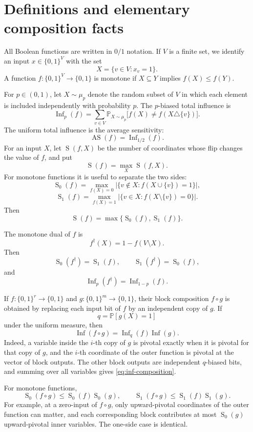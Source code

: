 \documentclass[11pt]{article}
\newcommand{\Prb}{\mathbb P}
\newcommand{\Inf}{\operatorname{Inf}}
\newcommand{\AS}{\operatorname{AS}}
\newcommand{\sens}{\operatorname{S}}
\begin{document}
\section{Definitions and elementary composition facts}\label{sec:defs}

All Boolean functions are written in \(0/1\) notation. If \(V\) is a finite set, we identify an input \(x\in\{0,1\}^V\) with the set
\[
    X=\{v\in V:x_v=1\}.
\]
A function \(f:\{0,1\}^V\to\{0,1\}\) is monotone if \(X\subseteq Y\) implies \(f(X)\le f(Y)\).

For \(p\in(0,1)\), let \(X\sim\mu_p\) denote the random subset of \(V\) in which each element is included independently with probability \(p\). The \(p\)-biased total influence is
\[
    \Inf_p(f)
    =
    \sum_{v\in V}
    \Prb_{X\sim\mu_p}\bigl[f(X)\ne f(X\triangle\{v\})\bigr].
\]
The uniform total influence is the average sensitivity:
\[
    \AS(f)=\Inf_{1/2}(f).
\]
For an input \(X\), let \(\sens(f,X)\) be the number of coordinates whose flip changes the value of \(f\), and put
\[
    \sens(f)=\max_X \sens(f,X).
\]
For monotone functions it is useful to separate the two sides:
\[
    \sens_0(f)=
    \max_{f(X)=0}
    \bigl|\{v\notin X:f(X\cup\{v\})=1\}\bigr|,
\]
\[
    \sens_1(f)=
    \max_{f(X)=1}
    \bigl|\{v\in X:f(X\setminus\{v\})=0\}\bigr|.
\]
Then
\[
    \sens(f)=\max\{\sens_0(f),\sens_1(f)\}.
\]

The monotone dual of \(f\) is
\[
    f^\dagger(X)=1-f(V\setminus X).
\]
Then
\[
    \sens_0(f^\dagger)=\sens_1(f),
    \qquad
    \sens_1(f^\dagger)=\sens_0(f),
\]
and
\[
    \Inf_p(f^\dagger)=\Inf_{1-p}(f).
\]

If \(f:\{0,1\}^r\to\{0,1\}\) and \(g:\{0,1\}^m\to\{0,1\}\), their block composition \(f\circ g\) is obtained by replacing each input bit of \(f\) by an independent copy of \(g\). If
\[
    q=\Prb[g(X)=1]
\]
under the uniform measure, then
\begin{equation}\label{eq:inf-composition}
    \Inf(f\circ g)=\Inf_q(f)\Inf(g).
\end{equation}
Indeed, a variable inside the \(i\)-th copy of \(g\) is pivotal exactly when it is pivotal for that copy of \(g\), and the \(i\)-th coordinate of the outer function is pivotal at the vector of block outputs. The other block outputs are independent \(q\)-biased bits, and summing over all variables gives \eqref{eq:inf-composition}.

For monotone functions,
\begin{equation}\label{eq:sens-composition}
    \sens_0(f\circ g)\le \sens_0(f)\sens_0(g),
    \qquad
    \sens_1(f\circ g)\le \sens_1(f)\sens_1(g).
\end{equation}
For example, at a zero-input of \(f\circ g\), only upward-pivotal coordinates of the outer function can matter, and each corresponding block contributes at most \(\sens_0(g)\) upward-pivotal inner variables. The one-side case is identical.
\end{document}
